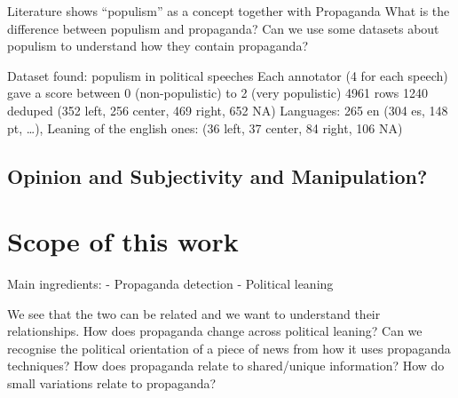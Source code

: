 Literature shows “populism” as a concept together with Propaganda
What is the difference between populism and propaganda?
Can we use some datasets about populism to understand how they contain propaganda?

Dataset found: populism in political speeches %
Each annotator (4 for each speech) gave a score between 0 (non-populistic) to 2 (very populistic)
4961 rows 
1240 deduped (352 left, 256 center, 469 right, 652 NA)
Languages: 265 en (304 es, 148 pt, …),
Leaning of the english ones: (36 left, 37 center, 84 right, 106 NA)


\subsection{Opinion and Subjectivity and Manipulation?}

\section{Scope of this work}

Main ingredients:
- Propaganda detection
- Political leaning

We see that the two can be related and we want to understand their relationships.
How does propaganda change across political leaning?
Can we recognise the political orientation of a piece of news from how it uses propaganda techniques?
How does propaganda relate to shared/unique information? How do small variations relate to propaganda?
